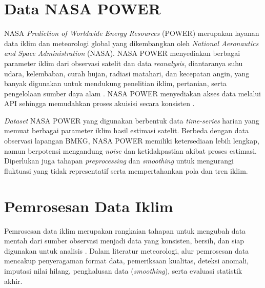 \section{Data NASA POWER}
NASA \textit{Prediction of Worldwide Energy Resources} (POWER) merupakan layanan data iklim dan meteorologi global yang dikembangkan oleh \textit{National Aeronautics and Space Administration} (NASA). NASA POWER menyediakan berbagai parameter iklim dari observasi satelit dan data \textit{reanalysis}, diantaranya suhu udara, kelembaban, curah hujan, radiasi matahari, dan kecepatan angin, yang banyak digunakan untuk mendukung penelitian iklim, pertanian, serta pengelolaan sumber daya alam \citep{rodrigues2021}. NASA POWER menyediakan akses data melalui API sehingga memudahkan proses akuisisi secara konsisten \citep{sparks2018}.

\textit{Dataset} NASA POWER yang digunakan berbentuk data \textit{time-series} harian yang memuat berbagai parameter iklim hasil estimasi satelit. Berbeda dengan data observasi lapangan BMKG, NASA POWER memiliki ketersediaan lebih lengkap, namun berpotensi mengandung \textit{noise} dan ketidakpastian akibat proses estimasi. Diperlukan juga tahapan \textit{preprocessing} dan \textit{smoothing} untuk mengurangi fluktuasi yang tidak representatif serta mempertahankan pola dan tren iklim.

\section{Pemrosesan Data Iklim}
Pemrosesan data iklim merupakan rangkaian tahapan untuk mengubah data mentah dari sumber observasi menjadi data yang konsisten, bersih, dan siap digunakan untuk analisis \citep{alsalehy2025}. Dalam literatur meteorologi, alur pemrosesan data mencakup penyeragaman format data, pemeriksaan kualitas, deteksi anomali, imputasi nilai hilang, penghalusan data (\textit{smoothing}), serta evaluasi statistik akhir.

